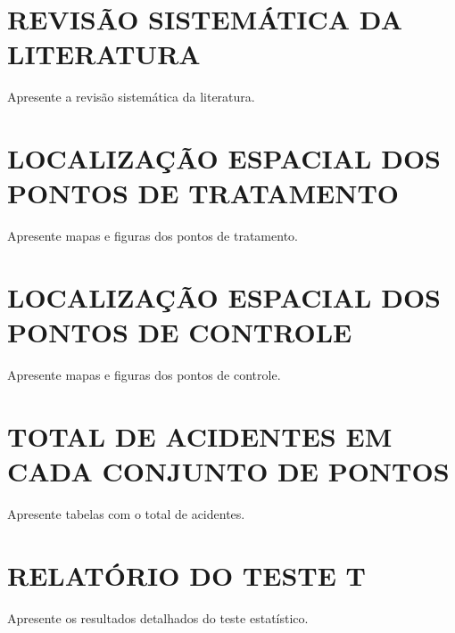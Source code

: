 \appendix

\chapter{REVISÃO SISTEMÁTICA DA LITERATURA}
\label{apendice:rsl}

Apresente a revisão sistemática da literatura.

\chapter{LOCALIZAÇÃO ESPACIAL DOS PONTOS DE TRATAMENTO}
\label{apendice:localizacao_tratamento}

Apresente mapas e figuras dos pontos de tratamento.

\chapter{LOCALIZAÇÃO ESPACIAL DOS PONTOS DE CONTROLE}
\label{apendice:localizacao_controle}

Apresente mapas e figuras dos pontos de controle.

\chapter{TOTAL DE ACIDENTES EM CADA CONJUNTO DE PONTOS}
\label{apendice:total_acidentes}

Apresente tabelas com o total de acidentes.

\chapter{RELATÓRIO DO TESTE T}
\label{apendice:teste_t}

Apresente os resultados detalhados do teste estatístico.
